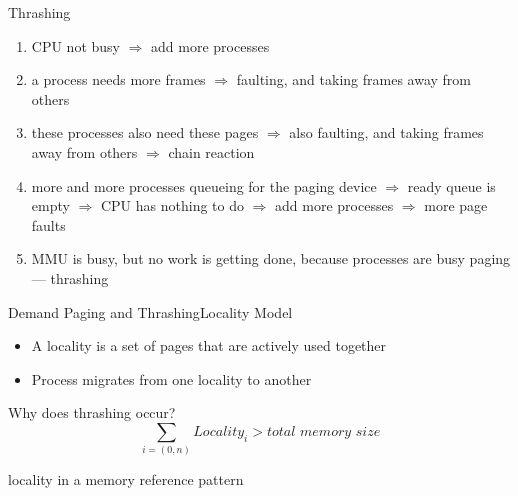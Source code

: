 \begin{frame}{Thrashing}
  \begin{minipage}{.38\linewidth}
  \end{minipage}
  \begin{minipage}{.6\linewidth}
    \begin{enumerate}
    \item CPU not busy $\Rightarrow$ add more processes
    \item a process needs more frames $\Rightarrow$ faulting, and taking frames away from
      others
    \item these processes also need these pages $\Rightarrow$ also faulting, and taking
      frames away from others $\Rightarrow$ chain reaction
    \item more and more processes queueing for the paging device $\Rightarrow$ ready queue
      is empty $\Rightarrow$ CPU has nothing to do $\Rightarrow$ add more processes
      $\Rightarrow$ more page faults
    \item MMU is busy, but no work is getting done, because processes are busy paging ---
      \alert{thrashing}
    \end{enumerate}
  \end{minipage}
\end{frame}

\begin{frame}{Demand Paging and Thrashing}{Locality Model}
  \begin{minipage}{.65\textwidth}
    \begin{itemize}
    \item A \alert{locality} is a set of pages that are actively used together
    \item Process migrates from one locality to another
    \end{itemize}
    \begin{iblock}{Why does thrashing occur?}
      \[\sum_{i=(0,n)}Locality_i > \textit{total memory size}\]
    \end{iblock}
  \end{minipage}\hfill
  \begin{minipage}{.3\textwidth}
     {\tiny locality in a
      memory reference pattern}
  \end{minipage}  
\end{frame}

